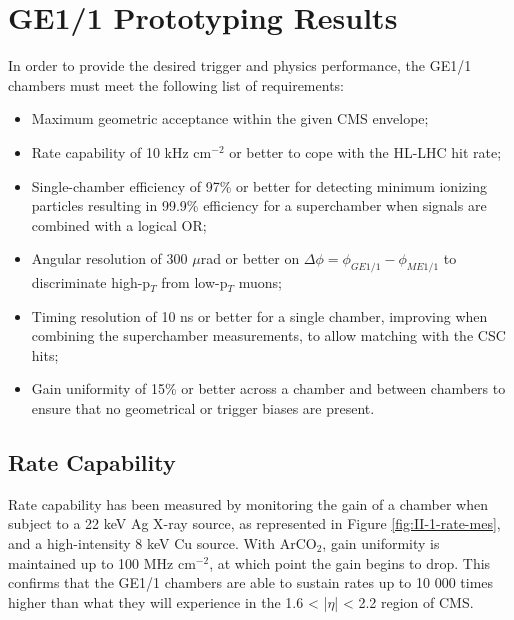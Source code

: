   \section{GE1/1 Prototyping Results}

    In order to provide the desired trigger and physics performance, the GE1/1 chambers must meet the following list of requirements:
    \begin{itemize}
      \item Maximum geometric acceptance within the given CMS envelope;
      \item Rate capability of 10 kHz cm$^{-2}$ or better to cope with the HL-LHC hit rate;
      \item Single-chamber efficiency of 97\% or better for detecting minimum ionizing particles resulting in 99.9\% efficiency for a superchamber when signals are combined with a logical OR;
      \item Angular resolution of 300 $\mu$rad or better on $ \Delta \phi = \phi_{GE1/1} - \phi_{ME1/1} $ to discriminate high-p$_T$ from low-p$_T$ muons;
      \item Timing resolution of 10 ns or better for a single chamber, improving when combining the superchamber measurements, to allow matching with the CSC hits;
      \item Gain uniformity of 15\% or better across a chamber and between chambers to ensure that no geometrical or trigger biases are present. \\
    \end{itemize}

    \subsection{Rate Capability}

      Rate capability has been measured by monitoring the gain of a chamber when subject to a 22 keV Ag X-ray source, as represented in Figure \ref{fig:II-1-rate-mes}, and a high-intensity 8 keV Cu source. With ArCO$_2$, gain uniformity is maintained up to 100 MHz cm$^{-2}$, at which point the gain begins to drop. This confirms that the GE1/1 chambers are able to sustain rates up to 10 000 times higher than what they will experience in the 1.6 < |$\eta$| < 2.2 region of CMS. \\

